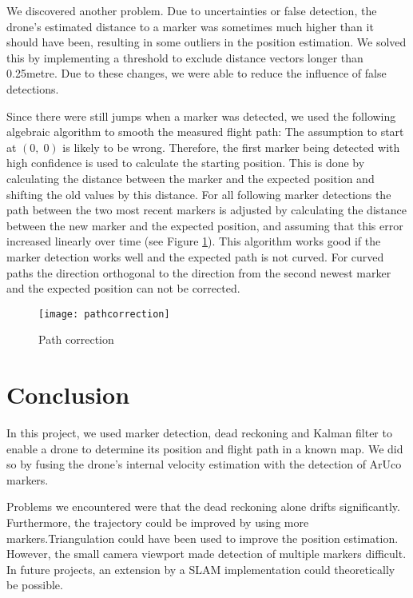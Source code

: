 \documentclass[12pt]{article}
\begin{document}
We discovered another problem. Due to uncertainties or false detection, the drone's estimated distance to a marker was sometimes much higher than it should have been, resulting in some outliers in the position estimation. We solved this by implementing a threshold to exclude distance vectors longer than \num{0.25}\si{metre}. Due to these changes, we were able to reduce the influence of false detections.

Since there were still jumps when a marker was detected, we used the following algebraic algorithm to smooth the measured flight path: The assumption to start at \((0, \; 0)\) is likely to be wrong. Therefore, the first marker being detected with high confidence is used to calculate the starting position. This is done by calculating the distance between the marker and the expected position and shifting the old values by this distance. For all following marker detections the path between the two most recent markers is adjusted by calculating the distance between the new marker and the expected position, and assuming that this error increased linearly over time (see Figure \ref{fig:correction}). This algorithm works good if the marker detection works well and the expected path is not curved. For curved paths the direction orthogonal to the direction from the second newest marker and the expected position can not be corrected. 

\begin{figure}[htbp]
	\centering
	\texttt{[image: pathcorrection]}
	\caption{Path correction}
	\label{fig:correction}
\end{figure}

\section{Conclusion} \label{sec:Conclusion}

In this project, we used marker detection, dead reckoning and Kalman filter to enable a drone to determine its position and flight path in a known map. We did so by fusing the drone's internal velocity estimation with the detection of ArUco markers.

Problems we encountered were that the dead reckoning alone drifts significantly. Furthermore, the trajectory could be improved by using more markers.Triangulation could have been used to improve the position estimation. However, the small camera viewport made detection of multiple markers difficult. In future projects, an extension by a SLAM implementation could theoretically be possible.
\end{document}
